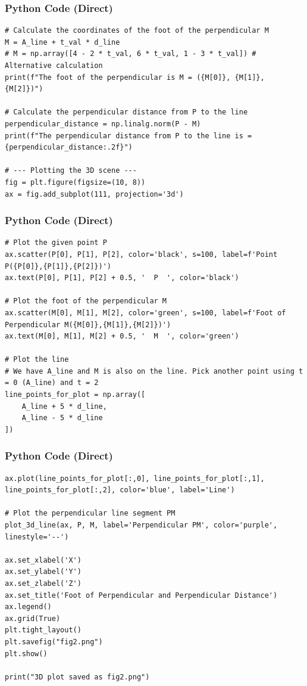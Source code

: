 \documentclass{beamer}
\begin{document}
\begin{frame}[fragile]
\frametitle{Python Code (Direct)}
\begin{lstlisting}
# Calculate the coordinates of the foot of the perpendicular M
M = A_line + t_val * d_line
# M = np.array([4 - 2 * t_val, 6 * t_val, 1 - 3 * t_val]) # Alternative calculation
print(f"The foot of the perpendicular is M = ({M[0]}, {M[1]}, {M[2]})")

# Calculate the perpendicular distance from P to the line
perpendicular_distance = np.linalg.norm(P - M)
print(f"The perpendicular distance from P to the line is = {perpendicular_distance:.2f}")

# --- Plotting the 3D scene ---
fig = plt.figure(figsize=(10, 8))
ax = fig.add_subplot(111, projection='3d')
\end{lstlisting}
\end{frame}

\begin{frame}[fragile]
\frametitle{Python Code (Direct)}
\begin{lstlisting}
# Plot the given point P
ax.scatter(P[0], P[1], P[2], color='black', s=100, label=f'Point P({P[0]},{P[1]},{P[2]})')
ax.text(P[0], P[1], P[2] + 0.5, '  P  ', color='black')

# Plot the foot of the perpendicular M
ax.scatter(M[0], M[1], M[2], color='green', s=100, label=f'Foot of Perpendicular M({M[0]},{M[1]},{M[2]})')
ax.text(M[0], M[1], M[2] + 0.5, '  M  ', color='green')

# Plot the line
# We have A_line and M is also on the line. Pick another point using t = 0 (A_line) and t = 2
line_points_for_plot = np.array([
    A_line + 5 * d_line,
    A_line - 5 * d_line
])
\end{lstlisting}
\end{frame}


\begin{frame}[fragile]
\frametitle{Python Code (Direct)}
\begin{lstlisting}
ax.plot(line_points_for_plot[:,0], line_points_for_plot[:,1], line_points_for_plot[:,2], color='blue', label='Line')

# Plot the perpendicular line segment PM
plot_3d_line(ax, P, M, label='Perpendicular PM', color='purple', linestyle='--')

ax.set_xlabel('X')
ax.set_ylabel('Y')
ax.set_zlabel('Z')
ax.set_title('Foot of Perpendicular and Perpendicular Distance')
ax.legend()
ax.grid(True)
plt.tight_layout()
plt.savefig("fig2.png")
plt.show()

print("3D plot saved as fig2.png")
\end{lstlisting}
\end{frame}
\end{document}
